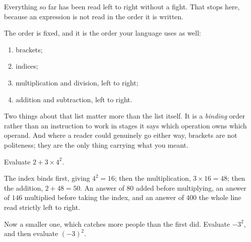 \begin{fr}
Everything so far has been read left to right without a fight. That stops here,
because an expression is not read in the order it is written.

The order is fixed, and it is the order your language uses as well:

\begin{enumerate}
\item brackets;
\item indices;
\item multiplication and division, left to right;
\item addition and subtraction, left to right.
\end{enumerate}

Two things about that list matter more than the list itself. It is a
\emph{binding} order rather than an instruction to work in stages \dash{} it
says which operation owns which operand. And where a reader could genuinely go
either way, brackets are not politeness; they are the only thing carrying what
you meant.

Evaluate $2 + 3 \times 4^{2}$.
\nextframe
\end{fr}

\begin{fr}
The index binds first, giving $4^{2} = 16$; then the multiplication,
$3 \times 16 = 48$; then the addition, $2 + 48 = 50$. An answer of $80$ added
before multiplying, an answer of $146$ multiplied before taking the index, and
an answer of $400$ the whole line read strictly left to right.

Now a smaller one, which catches more people than the first did. Evaluate
$-3^{2}$, and then evaluate $(-3)^{2}$.
\nextframe
\end{fr}

